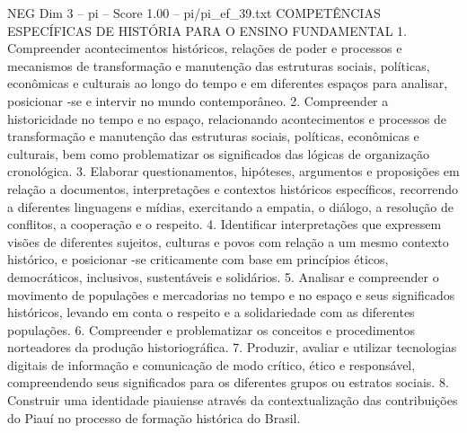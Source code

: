 \begin{textsample}{NEG Dim 3 – pi – Score 1.00 – pi/pi\_ef\_39.txt}  \label{ex:f3_neg_036}
COMPETÊNCIAS ESPECÍFICAS DE HISTÓRIA PARA O ENSINO FUNDAMENTAL 1.
Compreender acontecimentos históricos, relações de poder e processos e mecanismos de transformação e manutenção das estruturas sociais, políticas, econômicas e culturais ao longo do tempo e em diferentes espaços para analisar, posicionar -se e intervir no mundo contemporâneo. 2.
Compreender a historicidade no tempo e no espaço, relacionando acontecimentos e processos de transformação e manutenção das estruturas sociais, políticas, econômicas e culturais, bem como problematizar os significados das lógicas de organização cronológica. 3.
Elaborar questionamentos, hipóteses, argumentos e proposições em relação a documentos, interpretações e contextos históricos específicos, recorrendo a diferentes linguagens e mídias, exercitando a empatia, o diálogo, a resolução de conflitos, a cooperação e o respeito. 4.
Identificar interpretações que expressem visões de diferentes sujeitos, culturas e povos com relação a um mesmo contexto histórico, e posicionar -se criticamente com base em princípios éticos, democráticos, inclusivos, sustentáveis e solidários. 5.
Analisar e compreender o movimento de populações e mercadorias no tempo e no espaço e seus significados históricos, levando em conta o respeito e a solidariedade com as diferentes populações. 6.
Compreender e problematizar os conceitos e procedimentos norteadores da produção historiográfica. 7.
Produzir, avaliar e utilizar tecnologias digitais de informação e comunicação de modo crítico, ético e responsável, compreendendo seus significados para os diferentes grupos ou estratos sociais. 8.
Construir uma identidade piauiense através da contextualização das contribuições do Piauí no processo de formação histórica do Brasil.

\end{textsample}
